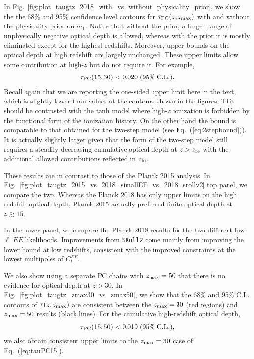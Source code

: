\documentclass[prd,twocolumn,amsmath,amssymb,floatfix,superscriptaddress,nofootinbib]{revtex4-1}
\newcommand{\zmax}{z_{\rm max}}
\newcommand{\beq}{\begin{equation}}
\newcommand{\eeq}{\end{equation}}
\begin{document}
{In Fig.~\ref{fig:plot_taugtz_2018_with_vs_without_physicality_prior}, we show the 
the 68\% and 95\% confidence level contours for  $\tau_{\rm PC}(z,z_{\rm max})$ with and without the physicality prior on $m_1$.  Notice that without the prior, a larger range of unphysically negative optical depth is allowed, whereas with the prior it is mostly eliminated except for the highest redshifts.  Moreover, upper bounds on the optical depth at high 
redshift are largely unchanged.   These upper limits allow some contribution at high-$z$ but do not require it.   For example,
%
\beq
\tau_{\rm PC}(15, 30) < 0.020 \; (95\%\; \mathrm{C.L.}).
\label{eq:tauPC15}
\eeq
%
Recall again that we are reporting the one-sided upper limit here in the text, which is slightly lower than values at the contours shown in the figures.
This should be contrasted with the tanh model 
where  high-$z$ ionization is forbidden by the functional form of the ionization history.
On the other hand the bound is comparable to that obtained for the two-step model (see Eq.~(\ref{eq:2stepbound})).  It is actually slightly larger given that the form of the two-step model still requires a steadily decreasing cumulative optical depth at $z>z_{\rm re}$ with the additional allowed contributions reflected in $\tau_{\rm hi}$.
 
These results are in contrast to those of the Planck 2015 analysis. In Fig.~\ref{fig:plot_taugtz_2015_vs_2018_simallEE_vs_2018_srollv2} top panel, we compare
the two. Whereas the Planck 2018 has only upper limits on the high redshift optical depth, Planck 2015 actually preferred
finite optical depth at $z\gtrsim 15$.

In the lower panel, we compare the Planck 2018 results for the two different low-$\ell$ $EE$ likelihoods.  Improvements from \texttt{SRoll2} come mainly from improving the lower bound at low redshifts, consistent with the improved constraints at the lowest multipoles of $C_l^{EE}$.

We also show using a separate PC chains with $\zmax = 50$ that there is no evidence for optical depth at $z>30$. 
In Fig.~\ref{fig:plot_taugtz_zmax30_vs_zmax50}, we show that the 68\% and 95\% C.L. contours of $\tau(z, \zmax)$ are consistent between the $\zmax = 30$ (red regions) and $\zmax = 50$ results (black lines). For the cumulative high-redshift optical depth,
\beq
\tau_{\rm PC}(15, 50) < 0.019 \; (95\%\; \mathrm{C.L.}),
\eeq
we also obtain consistent upper limits to the $\zmax=30$ case of Eq.~(\ref{eq:tauPC15}).

}
\end{document}
